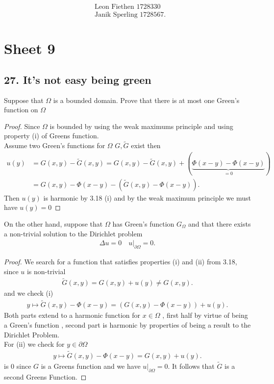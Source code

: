 \begin{align*}
  &\text{Leon Fiethen 1728330}\\
 &\text{Janik Sperling 1728567}
.\end{align*}
\section*{Sheet 9}
\subsection*{27. It's not easy being green}
\begin{exercise}
Suppose that $\Omega $ is a bounded domain. Prove that there is at most one Green's function on $\Omega $  
\end{exercise}
\begin{proof}
  Since $\Omega $ is bounded by using the  weak maximums principle and  using property (i) of Greens function.\\[1ex]
Assume two Green's functions for $\Omega $ $G,\tilde{G} $ exist then 
\begin{align*}
  u(y) &= G(x,y) - \tilde{G}(x,y) = G(x,y)-\tilde{G}(x,y) + (\underbrace{\Phi(x-y) - \Phi(x-y)}_{=0}) \\
       &= G(x,y)-\Phi(x-y)  - (\tilde{G}(x,y) - \Phi(x-y) )
.\end{align*}
Then $u(y)$ is harmonic by 3.18 (i) and by the weak maximum principle we must have $u(y)=  0$ 
\end{proof}
\begin{exercise}
  On the other hand, suppose that $\Omega $  has Green's function $G_{\Omega }$ and that there exists a non-trivial solution to the Dirichlet problem
  \begin{align*}
    \Delta u  = 0 \quad u \rvert_{\partial \Omega } = 0
  .\end{align*}

\end{exercise}
  \begin{proof} 
  We search for a function that satisfies properties (i) and (ii) from 3.18, since $u$ is non-trivial 
  \begin{align*}
    \tilde{G}(x,y) = G(x,y) + u(y)  \neq G(x,y)
  .\end{align*}
  and we check (i) 
  \begin{align*}
    y \mapsto \tilde{G}(x,y)  - \Phi(x-y) =  (G(x,y)-\Phi(x-y)) + u(y)
  .\end{align*}
  Both parts extend to a harmonic function  for $x \in  \Omega $ , first half  by virtue of being a Green's function , second part is harmonic by properties of being a result to the Dirichlet Problem.\\[1ex]
  For (ii) we check for $y \in  \partial \Omega $
  \begin{align*}
    y \mapsto \tilde{G}(x,y)  - \Phi(x-y) =  G(x,y) + u(y)
  .\end{align*}
  is $0$ since $G$ is a  Greens function and we have $u \rvert_{\partial \Omega } = 0$. 
  It follows that $\tilde{G} $ is a second Greens Function.
  \end{proof}
